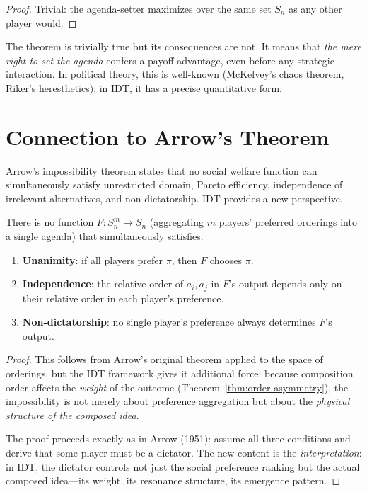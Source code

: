 \begin{proof}
Trivial: the agenda-setter maximizes over the same set $S_n$ as any other
player would.
\end{proof}

\begin{remark}
The theorem is trivially true but its consequences are not.  It means that
\emph{the mere right to set the agenda} confers a payoff advantage, even
before any strategic interaction.  In political theory, this is well-known
(McKelvey's chaos theorem, Riker's heresthetics); in IDT, it has a precise
quantitative form.
\end{remark}


\section{Connection to Arrow's Theorem}

Arrow's impossibility theorem states that no social welfare function can
simultaneously satisfy unrestricted domain, Pareto efficiency, independence of
irrelevant alternatives, and non-dictatorship.  IDT provides a new perspective.

\begin{theorem}
\label{thm:arrow-idt}
There is no function $F : S_n^m \to S_n$ (aggregating $m$ players' preferred
orderings into a single agenda) that simultaneously satisfies:
\begin{enumerate}
  \item \textbf{Unanimity}: if all players prefer $\pi$, then $F$ chooses
        $\pi$.
  \item \textbf{Independence}: the relative order of $a_i, a_j$ in $F$'s
        output depends only on their relative order in each player's
        preference.
  \item \textbf{Non-dictatorship}: no single player's preference always
        determines $F$'s output.
\end{enumerate}
\end{theorem}

\begin{proof}
This follows from Arrow's original theorem applied to the space of orderings,
but the IDT framework gives it additional force: because composition order
affects the \emph{weight} of the outcome (Theorem~\ref{thm:order-asymmetry}),
the impossibility is not merely about preference aggregation but about the
\emph{physical structure of the composed idea}.

The proof proceeds exactly as in Arrow (1951): assume all three conditions
and derive that some player must be a dictator.  The new content is the
\emph{interpretation}: in IDT, the dictator controls not just the social
preference ranking but the actual composed idea---its weight, its resonance
structure, its emergence pattern.
\end{proof}

